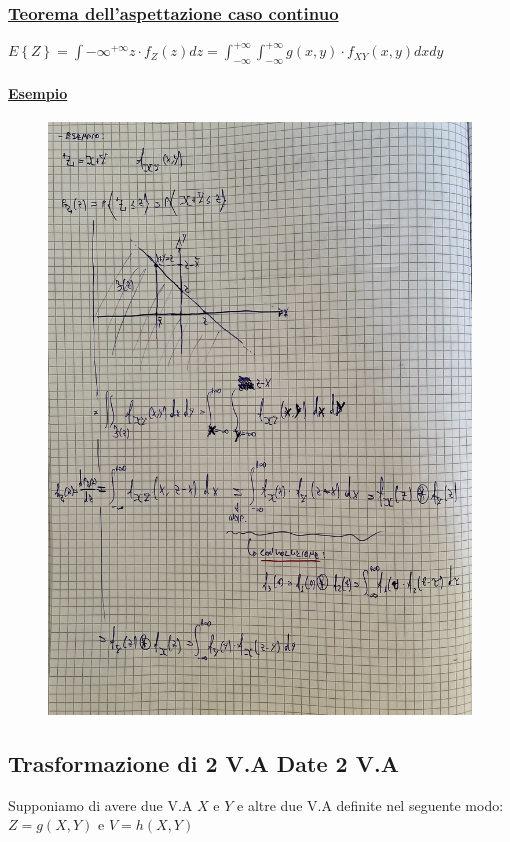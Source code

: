 \documentclass{article}
\begin{document}
\subsubsection{\underline{Teorema dell’aspettazione caso continuo}}
$E\left\{ Z \right\} = \int{-\infty}^{+\infty} z \cdot f_Z(z) dz = \int_{-\infty}^{+\infty} \int_{-\infty}^{+\infty} g(x,y) \cdot f_{XY}(x,y) dx dy$
\paragraph{\underline{Esempio}}
\begin{figure}[ht]
\centering
\includegraphics[scale=0.16]{ese/47.jpeg}
\end{figure} 

\subsection{Trasformazione di 2 V.A Date 2 V.A}
Supponiamo di avere due V.A $X$ e $Y$ e altre due V.A definite nel seguente modo: $Z = g(X,Y)$ e $V = h(X,Y)$
\end{document}
